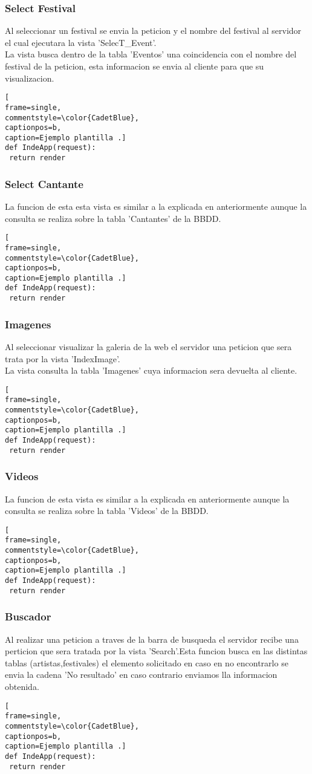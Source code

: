 \subsubsection*{Select Festival}
Al seleccionar un festival se envia la peticion y el nombre del festival al servidor el cual ejecutara la vista 'SelecT\_Event'.
\\La vista busca dentro de la tabla 'Eventos' una coincidencia con el nombre del festival de la peticion, esta informacion se envia al cliente para que su visualizacion.
\begin{lstlisting}[
frame=single,
commentstyle=\color{CadetBlue},
captionpos=b,
caption=Ejemplo plantilla .]
def IndeApp(request):
 return render 
\end{lstlisting}
\subsubsection*{Select Cantante}
La funcion de esta esta vista es similar a la explicada en anteriormente aunque la consulta se realiza sobre la tabla 'Cantantes' de la BBDD.
\begin{lstlisting}[
frame=single,
commentstyle=\color{CadetBlue},
captionpos=b,
caption=Ejemplo plantilla .]
def IndeApp(request):
 return render 
\end{lstlisting}
\subsubsection*{Imagenes}
Al seleccionar visualizar la galeria de la web el servidor una peticion que sera trata por la vista 'IndexImage'.
\\La vista consulta la tabla 'Imagenes' cuya informacion sera devuelta al cliente.
\begin{lstlisting}[
frame=single,
commentstyle=\color{CadetBlue},
captionpos=b,
caption=Ejemplo plantilla .]
def IndeApp(request):
 return render 
\end{lstlisting}
\subsubsection*{Videos}
La funcion de esta vista es similar a la explicada en anteriormente aunque la consulta se realiza sobre la tabla 'Videos' de la BBDD.
\begin{lstlisting}[
frame=single,
commentstyle=\color{CadetBlue},
captionpos=b,
caption=Ejemplo plantilla .]
def IndeApp(request):
 return render 
\end{lstlisting}
\subsubsection*{Buscador}
Al realizar una peticion a traves de la barra de busqueda el servidor recibe una perticion que sera tratada por la vista 'Search'.Esta funcion busca en las distintas tablas (artistas,festivales) el elemento solicitado en caso en no encontrarlo se envia la cadena 'No resultado' en caso contrario enviamos lla informacion obtenida.
\begin{lstlisting}[
frame=single,
commentstyle=\color{CadetBlue},
captionpos=b,
caption=Ejemplo plantilla .]
def IndeApp(request):
 return render 
\end{lstlisting}
